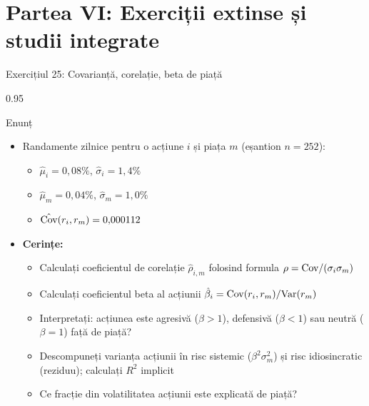\documentclass[9pt, aspectratio=169, t]{beamer}
\begin{document}
\section{Partea VI: Exerciții extinse și studii integrate}

\begin{frame}[shrink=25]{Exercițiul 25: Covarianță, corelație, beta de piață}
\begin{cminipage}{0.95\textwidth}
\begin{block}{Enunț}
\begin{itemize}\setlength{\itemsep}{0pt}
    \item Randamente zilnice pentru o acțiune $i$ și piața $m$ (eșantion $n = 252$):
    \begin{itemize}\setlength{\itemsep}{0pt}
        \item $\hat\mu_i = 0{,}08\%$, $\hat\sigma_i = 1{,}4\%$
        \item $\hat\mu_m = 0{,}04\%$, $\hat\sigma_m = 1{,}0\%$
        \item $\hat{\text{Cov}}(r_i, r_m) = 0{,}000112$
    \end{itemize}
    \item \textbf{Cerințe:}
    \begin{itemize}\setlength{\itemsep}{0pt}
        \item Calculați coeficientul de corelație $\hat\rho_{i,m}$ folosind formula $\rho = \text{Cov}/(\sigma_i \sigma_m)$
        \item Calculați coeficientul beta al acțiunii $\hat\beta_i = \text{Cov}(r_i, r_m)/\text{Var}(r_m)$
        \item Interpretați: acțiunea este agresivă ($\beta > 1$), defensivă ($\beta < 1$) sau neutră ($\beta = 1$) față de piață?
        \item Descompuneți varianța acțiunii în risc sistemic ($\beta^2 \sigma_m^2$) și risc idiosincratic (reziduu); calculați $R^2$ implicit
        \item Ce fracție din volatilitatea acțiunii este explicată de piață?
    \end{itemize}
\end{itemize}
\end{block}
\end{cminipage}
\end{frame}
\end{document}
